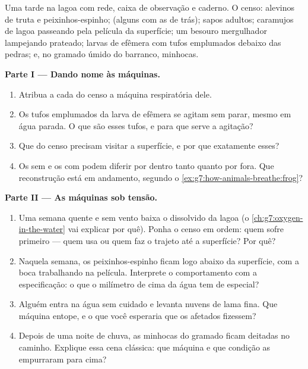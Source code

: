 \begin{problem}\label{pb:g7:how-animals-breathe:1}
Uma tarde na lagoa com rede, caixa de observação e caderno. O censo:
alevinos de truta e peixinhos-espinho;  (alguns com as 
de trás); sapos adultos; caramujos de lagoa passeando pela película da
superfície; um besouro mergulhador lampejando prateado; larvas de
efêmera com tufos emplumados debaixo das pedras; e, no gramado úmido
do barranco, minhocas.

\medskip\noindent\textbf{Parte I --- Dando nome às máquinas.}
\begin{enumerate}
  \item Atribua a cada  do censo a máquina respiratória dele.
  \item Os tufos emplumados da larva de efêmera se agitam sem parar,
        mesmo em água parada. O que são esses tufos, e para que serve
        a agitação?
  \item Que  do censo precisam visitar a superfície, e por que
        exatamente esses?
  \item Os  sem  e os com  podem diferir por
        dentro tanto quanto por fora. Que reconstrução está em
        andamento, segundo o \cref{ex:g7:how-animals-breathe:frog}?
\end{enumerate}

\medskip\noindent\textbf{Parte II --- As máquinas sob
tensão.}
\begin{enumerate}[resume]
  \item Uma semana quente e sem vento baixa o  dissolvido da
        lagoa (o \cref{ch:g7:oxygen-in-the-water} vai explicar por
        quê). Ponha o censo em ordem: quem sofre primeiro --- quem usa
         ou quem faz o trajeto até a superfície? Por quê?
  \item Naquela semana, os peixinhos-espinho ficam logo abaixo da
        superfície, com a boca trabalhando na película. Interprete o
        comportamento com a especificação: o que o milímetro de cima
        da água tem de especial?
  \item Alguém entra na água sem cuidado e levanta nuvens de lama
        fina. Que máquina entope, e o que você esperaria que os
         afetados fizessem?
  \item Depois de uma noite de chuva, as minhocas do gramado ficam
        deitadas no caminho. Explique essa cena clássica: que máquina
        e que condição as empurraram para cima?
\end{enumerate}


\end{problem}
